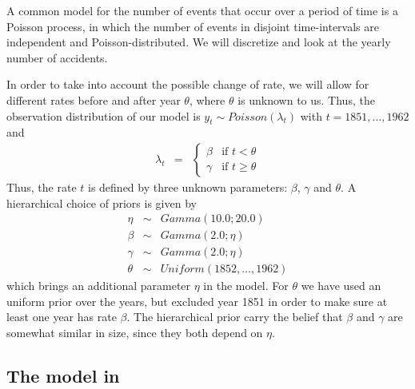A common model for the number of events that occur over a period of time is a Poisson process, in which the number of events in disjoint time-intervals are independent and Poisson-distributed. 
We will discretize and look at the yearly number of accidents. 

In order to take into account the possible change of rate, we will allow for different rates before and after year $\theta$, where $\theta$ is unknown to us. 
Thus, the observation distribution of our model is 
$y_t \sim Poisson(\lambda_t)$ with $t = 1851,\ldots,1962$ and
\begin{eqnarray*}
\lambda_t & = & \begin{cases}
\beta & \mbox{if } t < \theta \\
\gamma & \mbox{if } t \geq \theta
\end{cases}
\end{eqnarray*}
Thus, the rate $t$ is defined by three unknown parameters: $\beta$, $\gamma$ and $\theta$. A hierarchical choice of priors is given by
\begin{eqnarray*}
 \eta & \sim & Gamma(10.0;20.0) \\ 
 \beta & \sim & Gamma(2.0;\eta) \\
 \gamma & \sim &Gamma(2.0;\eta) \\
 \theta & \sim & Uniform(1852,\ldots,1962)
\end{eqnarray*}
which brings an additional parameter $\eta$ in the model. 
For $\theta$ we have used an uniform prior over the years, but excluded year 1851 in order to make sure at least one year has rate $\beta$. 
The hierarchical prior carry the belief that $\beta$ and $\gamma$ are somewhat similar in size,
since they both depend on $\eta$. 

\subsection*{The model in \Rev}

